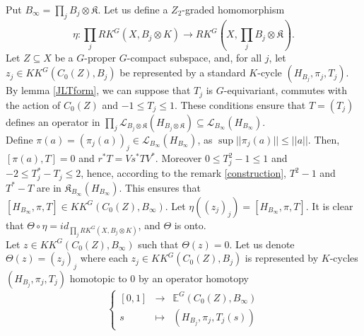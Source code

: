 \begin{dem}
Put $B_\infty = \prod_j B_j\otimes \mathfrak K $. Let us define a $Z_2$-graded homomorphism 
\[\eta :  \prod_j RK^G(X,B_j\otimes K) \rightarrow RK^G(X,\prod_j B_j\otimes \mathfrak K).\] 
Let $Z\subseteq X$ be a $G$-proper $G$-compact subspace, and, for all $j$, let $z_j\in KK^G(C_0(Z),B_j)$ be represented by a standard $K$-cycle $(H_{B_j},\pi_j ,T_j)$. By lemma \ref{JLTform}, we can suppose that $T_j$ is $G$-equivariant, commutes with the action of $C_0(Z)$ and $-1\leq T_j \leq 1$. These conditions ensure that $T = (T_j)$ defines an operator in $\prod_j \mathcal L_{B_j\otimes \mathfrak K}(H_{B_j\otimes \mathfrak K})\subseteq \mathcal L_{B_\infty}(H_{B_\infty})$.\\

Define $\pi(a) = (\pi_j(a))_j\in  \mathcal L_{B_\infty}(H_{B_\infty})$, as $\sup ||\pi_j(a)||\leq ||a||$. Then, $[\pi(a),T]=0$ and $r^*T = Vs^*T V^*$. Moreover $0\leq T_j^2-1\leq 1$ and $-2\leq T_j^*-T_j\leq 2$, hence, according to the remark \ref{construction}, $T^2-1$ and $T^*-T$ are in $\mathfrak K_{B_\infty}(H_{B_\infty})$. 
This ensures that $[H_{B_\infty},\pi,T]\in KK^G(C_0(Z),B_\infty)$. Let $\eta((z_j)_j) = [H_{B_\infty},\pi,T] $. It is clear that $\Theta\circ \eta = id_{\prod_j RK^G(X,B_j\otimes K) }$, and $\Theta $ is onto.\\

Let $z\in KK^G(C_0(Z),B_\infty)$ such that $\Theta(z) = 0$. Let us denote $\Theta(z) = (z_j)_j$ where each $z_j\in KK^G(C_0(Z),B_j)$ is represented by $K$-cycles $(H_{B_j}, \pi_j,T_j)$ homotopic to $0$ by an operator homotopy 
\[\left\{\begin{array}{rcl} [0,1] & \rightarrow & \mathbb E^G(C_0(Z),B_\infty)\\ s & \mapsto & (H_{B_j}, \pi_j,T_j(s))\end{array}\right.\] 


\end{dem}
